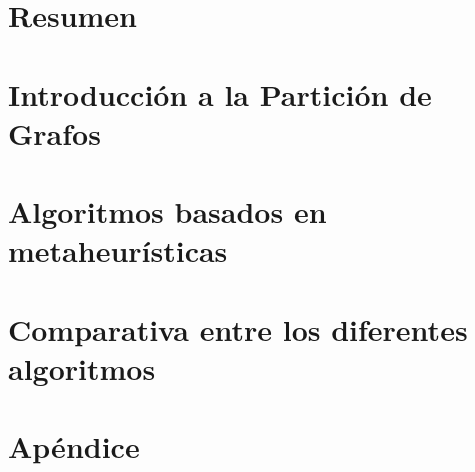 \documentclass[a4paper,10pt,twoside]{report}
\author{\me}
\begin{document}


\normalsize

\chapter*{Resumen}\label{chapter:Resumen}
\setcounter{page}{0}


\tableofcontents

\chapter{Introducción a la Partición de Grafos}\label{chapter:Introducción}


\chapter{Algoritmos basados en metaheurísticas}\label{chapter:Algoritmos}


%

%

\chapter{Comparativa entre los diferentes algoritmos}\label{chapter:Comparativa}







\appendix
{}
\chapter{Apéndice}\label{chapter:Apéndice}

\end{document}
